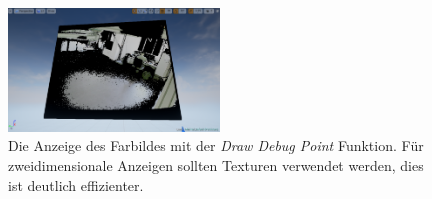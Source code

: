 \documentclass[a4paper]{IEEEtran}
\begin{document}
\begin{figure}[!h]
    	\centering
		\includegraphics[width=0.5\textwidth]{img/2DColor}
	    \caption{Die Anzeige des Farbildes mit der {\textit{Draw Debug Point}} Funktion. Für zweidimensionale Anzeigen sollten Texturen verwendet werden, dies ist deutlich effizienter.}
    	\label{2DColor}
	\end{figure} 
	
\end{document}
